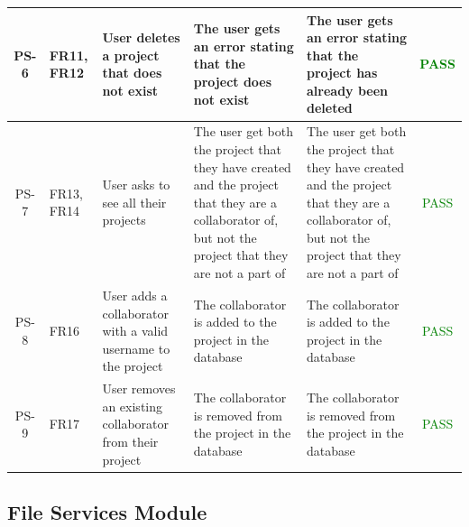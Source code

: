 \documentclass[12pt, titlepage]{article}
\begin{document}
\begin{center}
\begin{longtable}{|c|p{1cm}|p{2.7cm}|p{3cm}|p{3cm}|c|}
			\hline
			PS-6 & FR11, FR12  & User deletes a project that does not exist & The user gets an error stating that the project does not exist & The user gets an error stating that the project has already been deleted &  \textcolor{green}{PASS} \\
			\hline
			PS-7 & FR13, FR14 & User asks to see all their projects & The user get both the project that they have created and the project that they are a collaborator of, but not the project that they are not a part of & The user get both the project that they have created and the project that they are a collaborator of, but not the project that they are not a part of &  \textcolor{green}{PASS} \\
			\hline
			PS-8 & FR16 & User adds a collaborator with a valid username to the project & The collaborator is added to the project in the database & The collaborator is added to the project in the database &  \textcolor{green}{PASS} \\
			\hline
			PS-9 & FR17 & User removes an existing collaborator from their project & The collaborator is removed from the project in the database & The collaborator is removed from the project in the database &  \textcolor{green}{PASS} \\
			\hline
		\end{longtable}
	\end{center}
	
	\subsection{File Services Module}
	
\end{document}

